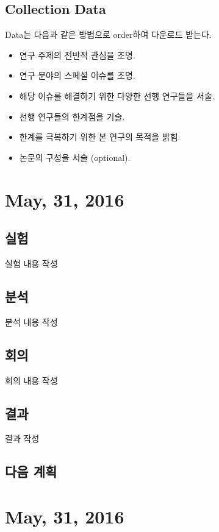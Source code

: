\documentclass{research-note-v1.0}
\begin{document}
	\subsection*{Collection Data}
     Data는 다음과 같은 방법으로 order하여 다운로드 받는다.

	\begin{itemize}
		\item{연구 주제의 전반적 관심을 조명.}
		\item{연구 분야의 스페셜 이슈를 조명.}
		\item{해당 이슈를 해결하기 위한 다양한 선행 연구들을 서술.}
		\item{선행 연구들의 한계점을 기술.}
		\item{한계를 극복하기 위한 본 연구의 목적을 밝힘.}
		\item{논문의 구성을 서술 (optional).}
	\end{itemize}


\section*{May, 31, 2016}

\subsection*{실험}

실험 내용 작성

\subsection*{분석}

 분석 내용 작성

\subsection*{회의}

회의 내용 작성

\subsection*{결과}

결과 작성


\subsection*{다음 계획}


\section*{May, 31, 2016}
\end{document}
